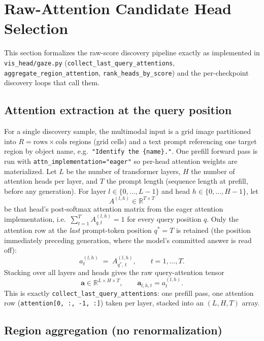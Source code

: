\section{Raw-Attention Candidate Head Selection}
\label{sec:raw-head-selection}

This section formalizes the raw-score discovery pipeline exactly as
implemented in \texttt{vis\_head/gaze.py}
(\texttt{collect\_last\_query\_attentions},
\texttt{aggregate\_region\_attention}, \texttt{rank\_heads\_by\_score}) and the
per-checkpoint discovery loops that call them.

\subsection{Attention extraction at the query position}

For a single discovery sample, the multimodal input is a grid image
partitioned into $R = \text{rows}\times\text{cols}$ regions (grid cells) and a
text prompt referencing one target region by object name, e.g.\
\texttt{"Identify the \{name\}."}. One prefill forward pass is run with
\texttt{attn\_implementation="eager"} so per-head attention weights are
materialized. Let $L$ be the number of transformer layers, $H$ the number of
attention heads per layer, and $T$ the prompt length (sequence length at
prefill, before any generation). For layer $l \in \{0,\dots,L-1\}$ and head
$h \in \{0,\dots,H-1\}$, let
\[
  A^{(l,h)} \in \mathbb{R}^{T \times T}
\]
be that head's post-softmax attention matrix from the eager attention
implementation, i.e.\ $\sum_{t=1}^{T} A^{(l,h)}_{q,t} = 1$ for every query
position $q$. Only the attention row at the \emph{last} prompt-token position
$q^{*} = T$ is retained (the position immediately preceding generation,
where the model's committed answer is read off):
\[
  a^{(l,h)}_{t} \;=\; A^{(l,h)}_{q^{*},\, t}, \qquad t = 1,\dots,T .
\]
Stacking over all layers and heads gives the raw query-attention tensor
\[
  \mathbf{a} \in \mathbb{R}^{L \times H \times T},
  \qquad
  \mathbf{a}_{l,h,t} = a^{(l,h)}_{t}.
\]
This is exactly \texttt{collect\_last\_query\_attentions}: one prefill pass,
one attention row (\texttt{attention[0, :, -1, :]}) taken per layer, stacked
into an $(L, H, T)$ array.

\subsection{Region aggregation (no renormalization)}

